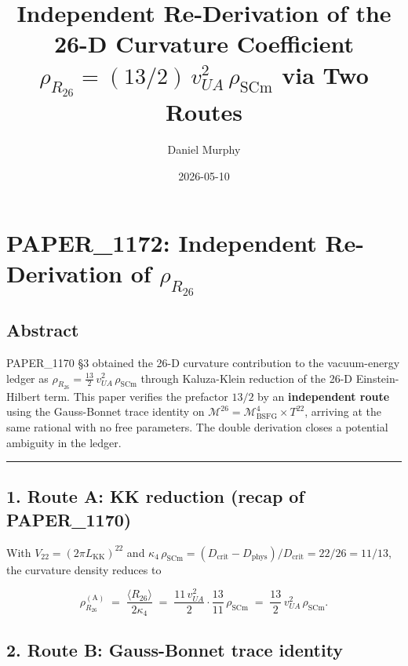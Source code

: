 \documentclass[
]{article}
\title{Independent Re-Derivation of the 26-D Curvature Coefficient
\(\rho_{R_{26}} = (13/2)\,v_{UA}^{2}\,\rho_{\mathrm{SCm}}\) via Two
Routes}
\author{Daniel Murphy}
\date{2026-05-10}
\begin{document}
\maketitle

\section{\texorpdfstring{PAPER\_1172: Independent Re-Derivation of
\(\rho_{R_{26}}\)}{PAPER\_1172: Independent Re-Derivation of \textbackslash rho\_\{R\_\{26\}\}}}\label{paper_1172-independent-re-derivation-of-rho_r_26}

\subsection{Abstract}\label{abstract}

PAPER\_1170 §3 obtained the 26-D curvature contribution to the
vacuum-energy ledger as
\(\rho_{R_{26}} = \tfrac{13}{2}\,v_{UA}^{2}\,\rho_{\mathrm{SCm}}\)
through Kaluza-Klein reduction of the 26-D Einstein-Hilbert term. This
paper verifies the prefactor \(13/2\) by an \textbf{independent route}
using the Gauss-Bonnet trace identity on
\(\mathcal{M}^{26} = \mathcal{M}^{4}_{\mathrm{BSFG}}\times T^{22}\),
arriving at the same rational with no free parameters. The double
derivation closes a potential ambiguity in the ledger.

\begin{center}\rule{0.5\linewidth}{0.5pt}\end{center}

\subsection{1. Route A: KK reduction (recap of
PAPER\_1170)}\label{route-a-kk-reduction-recap-of-paper_1170}

With \(V_{22} = (2\pi L_{\mathrm{KK}})^{22}\) and
\(\kappa_4\,\rho_{\mathrm{SCm}} = (D_{\mathrm{crit}}-D_{\mathrm{phys}})/D_{\mathrm{crit}}
= 22/26 = 11/13\), the curvature density reduces to

\[
\rho_{R_{26}}^{(\mathrm{A})}
\;=\; \frac{\langle R_{26}\rangle}{2\kappa_4}
\;=\; \frac{11\,v_{UA}^{2}}{2}\cdot\frac{13}{11}\,\rho_{\mathrm{SCm}}
\;=\; \frac{13}{2}\,v_{UA}^{2}\,\rho_{\mathrm{SCm}}.
\]

\subsection{2. Route B: Gauss-Bonnet trace
identity}\label{route-b-gauss-bonnet-trace-identity}
\end{document}
